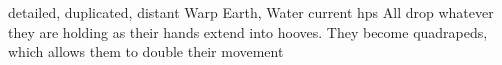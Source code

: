   {detailed, duplicated, distant}%
  {Warp}%
  {Earth, Water}%
  {current \glspl{hp}}%
  {All  drop whatever they are holding as their hands extend into hooves.  They become quadrapeds, which allows them to double their movement}%
  {}
